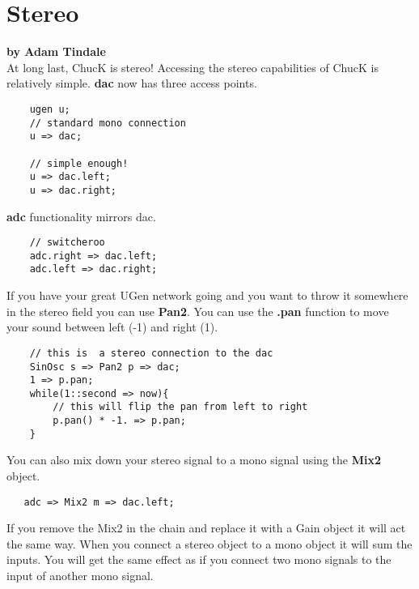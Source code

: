 \section{Stereo}
\textbf{by Adam Tindale}\\

At long last, ChucK is stereo! Accessing the stereo capabilities of ChucK is relatively simple. {\bf dac} now has three access points. 

\begin{verbatim}
    ugen u;
    // standard mono connection
    u => dac;

    // simple enough!
    u => dac.left;
    u => dac.right;
\end{verbatim}

{\bf adc} functionality mirrors dac. 

\begin{verbatim}
    // switcheroo
    adc.right => dac.left;
    adc.left => dac.right;
\end{verbatim}

If you have your great UGen network going and you want to throw it somewhere in the stereo field you can use {\bf Pan2}. You can use the {\bf .pan} function to move your sound between left (-1) and right (1).

\begin{verbatim}
    // this is  a stereo connection to the dac
    SinOsc s => Pan2 p => dac;
    1 => p.pan;
    while(1::second => now){
        // this will flip the pan from left to right
        p.pan() * -1. => p.pan;
    }
\end{verbatim}


You can also mix down your stereo signal to a mono signal using the {\bf Mix2} object. 

\begin{verbatim}
   adc => Mix2 m => dac.left;
\end{verbatim}

If you remove the Mix2 in the chain and replace it with a Gain object it will act the same way. When you connect a stereo object to a mono object it will sum the inputs. You will get the same effect as if you connect two mono signals to the input of another mono signal. 
